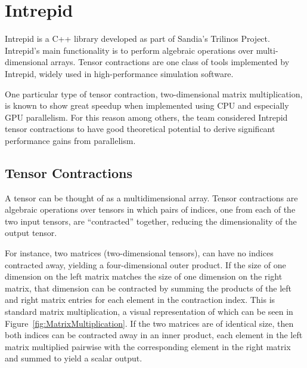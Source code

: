 \chapter{Intrepid} \label{sec:IntroIntrepid}
Intrepid is a C++ library developed as part of Sandia's Trilinos Project.
Intrepid's main functionality is to perform algebraic operations over 
multi-dimensional arrays. Tensor
contractions are one class of tools implemented by Intrepid, widely used in
high-performance simulation software.

One particular type of tensor contraction, two-dimensional matrix
multiplication, is known to show great speedup when implemented using CPU and
especially GPU parallelism. For this reason among others, the team considered
Intrepid tensor contractions to have good theoretical potential to derive
significant performance gains from parallelism.

\section{Tensor Contractions}
A tensor can be thought of as a multidimensional array. Tensor contractions are
algebraic operations over tensors in which pairs of indices, one from each of
the two input tensors, are ``contracted'' together, reducing the dimensionality
of the output tensor. 

For instance, two matrices (two-dimensional tensors), can have no indices
contracted away, yielding a four-dimensional outer product. If the size of one
dimension on the left matrix matches the size of one dimension on the right
matrix, that dimension can be contracted by summing the products of the left and
right matrix entries for each element in the contraction index. This is
standard matrix multiplication, a visual representation of which can be seen in
Figure~\ref{fig:MatrixMultiplication}. If the two matrices are of identical
size, then both indices can be contracted away in an inner product, each element
in the left matrix multiplied pairwise with the corresponding element in the
right matrix and summed to yield a scalar output.

